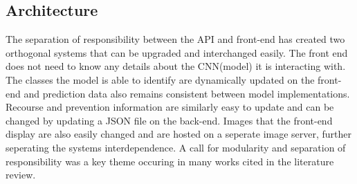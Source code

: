   \subsection{Architecture}
    The separation of responsibility between the API and front-end has created two orthogonal systems that can be upgraded and interchanged easily. The front end does not need to know any details about the CNN(model) it is interacting with. The classes the model is able to identify are dynamically updated on the front-end and prediction data also remains consistent between model implementations. Recourse and prevention information are similarly easy to update and can be changed by updating a JSON file on the back-end. Images that the front-end display are also easily changed and are hosted on a seperate image server, further seperating the systems interdependence. A call for modularity and separation of responsibility was a key theme occuring in many works cited in the literature review.

